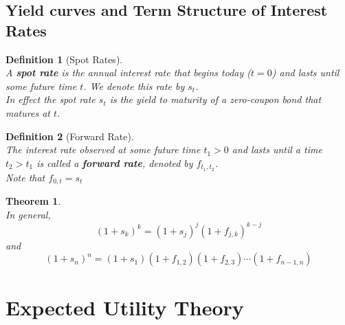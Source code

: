 \documentclass[12pt]{article}
\newtheorem{definition}{Definition}[section]
\newtheorem{theorem}{Theorem}[section]
\theoremstyle{definition}
\begin{document}
\subsection{Yield curves and Term Structure of Interest Rates}
\begin{definition}[Spot Rates]
\hfill\\\normalfont A \textbf{spot rate} is the \textit{annual} interest rate that begins today ($t=0$) and lasts until some future time $t$. We denote this rate by $s_t$.\\In effect the spot rate $s_t$ is the yield to maturity of a zero-coupon bond that matures at $t$.
\end{definition}
\begin{definition}[Forward Rate]
\hfill\\\normalfont The interest rate observed at some future time $t_1>0$ and lasts until a time $t_2>t_1$ is called a \textbf{forward rate}, denoted by $f_{t_1,t_2}$. \\Note that $f_{0,t}=s_t$
\end{definition}
\begin{theorem}
\hfill\\\normalfont In general,
\[
(1+s_k)^k = (1+s_j)^j(1+f_{j,k})^{k-j}
\] 
and
\[
(1+s_n)^n = (1+s_1)(1+f_{1,2})(1+f_{2,3})\cdots(1+f_{n-1,n})
\]
\end{theorem}
\clearpage
\section{Expected Utility Theory}
\end{document}
